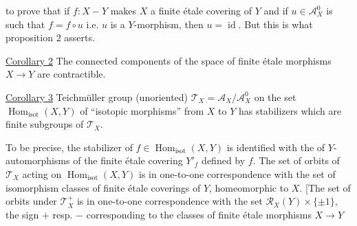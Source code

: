 to prove that if $f:X\mathbin{-}Y$ makes $X$ a finite étale covering of $Y$ and if $u\in\mathcal{A}_X^0$ is such that $f=f\circ u$ i.e. $u$ is a $Y$-morphism, then $u=\operatorname{id}$. But this is what proposition 2 asserts.

\uline{Corollary 2} The connected components of the space of finite étale morphisms $X\longrightarrow Y$ are contractible.

\uline{Corollary 3}   Teichmüller group (unoriented) $\mathcal{T}_X=\mathcal{A}_X/\mathcal{A}_X^0$ on the set $\operatorname{Hom}_{\mathrm{isot}}(X,Y)$ of ``isotopic morphisms'' from $X$ to $Y$  has stabilizers which are finite subgroups of $\mathcal{T}_X$.

To be precise, the stabilizer of $f\in\operatorname{Hom}_{\mathrm{isot}}(X,Y)$ is identified with the    of $Y$-automorphisms of the finite étale covering $Y'_f$ defined by $f$. The set of orbits of $\mathcal{T}_X$ acting on $\operatorname{Hom}_{\mathrm{isot}}(X,Y)$ is in one-to-one correspondence with the set  of isomorphism classes of finite étale coverings of $Y$, homeomorphic to $X$.
[The set of orbits under $\mathcal{T}_X^+$ is in one-to-one correspondence with the set $\mathcal{R}_X(Y)\times\{\pm1\}$, the sign $+$ resp. $-$ corresponding to the classes of finite étale morphisms $X\longrightarrow Y$
